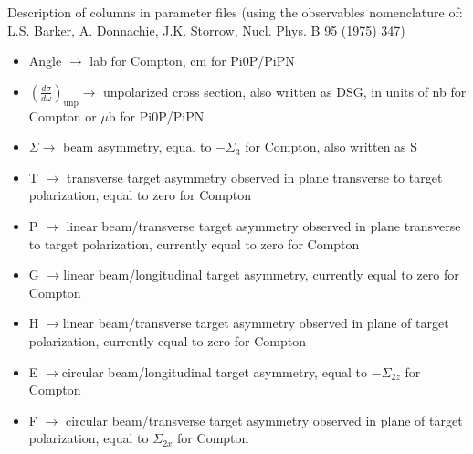 \documentclass[twoside,letterpaper,12pt]{article}
\begin{document}
Description of columns in parameter files (using the observables nomenclature of: L.S. Barker, A. Donnachie, J.K. Storrow, Nucl. Phys. B 95 (1975) 347)
\begin{itemize}
\item Angle $\rightarrow$ lab for Compton, cm for Pi0P/PiPN
\item $\left(\frac{d\sigma}{d\omega}\right)_{\mathrm{unp}}\rightarrow$ unpolarized cross section, also written as DSG, in units of nb for Compton or $\mu$b for Pi0P/PiPN
\item $\Sigma\rightarrow$ beam asymmetry, equal to $-\Sigma_{3}$ for Compton, also written as S
\item T $\rightarrow$ transverse target asymmetry observed in plane transverse to target polarization, equal to zero for Compton
\item P $\rightarrow$ linear beam/transverse target asymmetry observed in plane transverse to target polarization, currently equal to zero for Compton
\item G  $\rightarrow$linear beam/longitudinal target asymmetry, currently equal to zero for Compton
\item H  $\rightarrow$linear beam/transverse target asymmetry observed in plane of target polarization, currently equal to zero for Compton
\item E  $\rightarrow$circular beam/longitudinal target asymmetry, equal to $-\Sigma_{2z}$ for Compton
\item F $\rightarrow$ circular beam/transverse target asymmetry observed in plane of target polarization, equal to $\Sigma_{2x}$ for Compton
\end{itemize}
\end{document}
